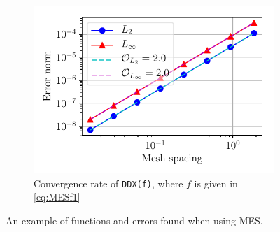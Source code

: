 \begin{figure}[t!]
    ~
    \begin{subfigure}[t]{0.7\textwidth}
        \centering
        \includegraphics[width=1.0\textwidth]{fig/conv}
        \caption{Convergence rate of \texttt{DDX(f)}, where $f$ is given in \cref{eq:MESf1}}
    \end{subfigure}
    \caption{An example of functions and errors found when using MES.}
\end{figure}


